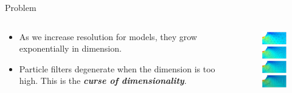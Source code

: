 \documentclass[aspectratio=169]{beamer}
\newcommand\boldgreen[1]{\textcolor{lighter_csu_green}{\emph{\textbf{#1}}}}
\begin{document}

\begin{frame}{Problem}
\vfill

\begin{columns}
    \begin{column}{.49\textwidth}
\begin{itemize}
    \item As we increase resolution for models, they grow exponentially in dimension.
    \item Particle filters degenerate when the dimension is too high. This is the \boldgreen{curse of dimensionality}.
\end{itemize}
    \end{column}

 \begin{column}{.49\textwidth}
        \begin{figure}[h]
            \centering
            \vspace*{-2cm}
            \includegraphics[width=35mm]{figures/mesh_refinement.png}
        \end{figure}
 \end{column}
\end{columns}
\vfill
\end{frame}

\end{document}
